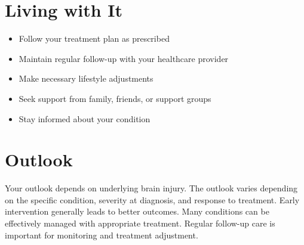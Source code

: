 \section{Living with It}
\begin{itemize}[noitemsep]
  \item Follow your treatment plan as prescribed
  \item Maintain regular follow-up with your healthcare provider
  \item Make necessary lifestyle adjustments
  \item Seek support from family, friends, or support groups
  \item Stay informed about your condition
\end{itemize}
\section{Outlook}
Your outlook depends on underlying brain injury. The outlook varies depending on the specific condition, severity at diagnosis, and response to treatment. Early intervention generally leads to better outcomes. Many conditions can be effectively managed with appropriate treatment. Regular follow-up care is important for monitoring and treatment adjustment.
